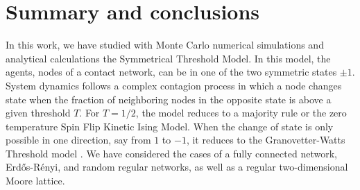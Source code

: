 
\section{\label{Summary and conclusions} Summary and conclusions}


In this work, we have studied with Monte Carlo numerical simulations and analytical calculations the Symmetrical Threshold Model. In this model, the agents, nodes of a contact  network, can be in one of the two symmetric states $\pm 1$.  System dynamics follows a complex contagion process in which a node changes state when the fraction of neighboring nodes in the opposite state is above a given threshold $T$. For $T=1/2$, the model reduces to a majority rule or the zero temperature Spin Flip Kinetic Ising Model. When the change of state is only possible in one direction, say from $1$ to $-1$, it reduces to the Granovetter-Watts Threshold model \cite{granovetter-1978,watts-2002,Abella-2022-AME}. We have considered the cases of a fully connected network, Erd\H{o}s-Rényi, and random regular networks, as well as a regular two-dimensional Moore lattice. 

